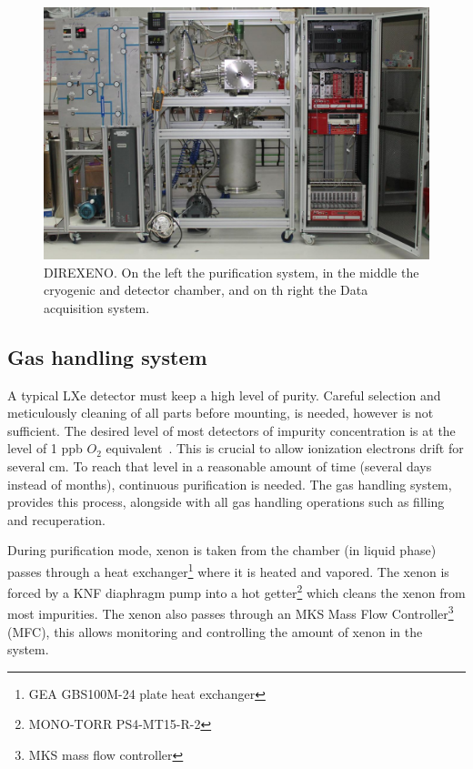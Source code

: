 \begin{figure}[t!]
\centerline{\includegraphics[width=1.\linewidth]{FullDet.jpg}}
\caption{DIREXENO. On the left the purification system, in the middle the cryogenic and detector chamber, and on th right the Data acquisition system.}
\label{fig:fulldet}
\end{figure}

\subsection{Gas handling system}
\label{subsec:gas}

A typical LXe detector must keep a high level of purity. Careful selection and meticulously cleaning of all parts before mounting, 
is needed, however is not sufficient. The desired level of most detectors of impurity concentration is at the level of 1 ppb $O_2$ 
equivalent~\cite{Aprile:2009dv}. This is crucial to allow ionization electrons drift for several cm. To reach that level in a 
reasonable amount of time (several days instead of months), continuous purification is needed. The gas handling system, provides this process, 
alongside with all gas handling operations such as filling and recuperation.

During purification mode, xenon is taken from the chamber (in liquid phase)
passes through a heat exchanger\footnote{GEA GBS100M-24 plate heat exchanger} where it is heated and vapored. The xenon is forced 
by a KNF diaphragm pump into a hot getter\footnote{MONO-TORR
PS4-MT15-R-2} which cleans the xenon from most impurities. The xenon
also passes through an MKS Mass Flow Controller\footnote{MKS mass flow controller} (MFC), this allows monitoring and controlling the amount of xenon in the system. 


